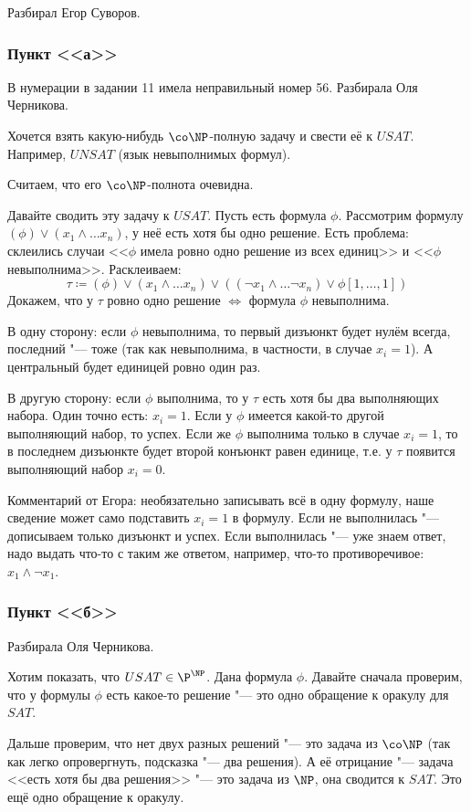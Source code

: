 	Разбирал Егор Суворов.

	\TODO

	\subsubsection{Пункт <<а>>}
	В нумерации в задании 11 имела неправильный номер 56.
	Разбирала Оля Черникова.

	Хочется взять какую-нибудь $\co\NP$-полную задачу и свести её к $USAT$.
	Например, $UNSAT$ (язык невыполнимых формул).
	\begin{Rem}
		Считаем, что его $\co\NP$-полнота очевидна.
		\TODO
	\end{Rem}
	Давайте сводить эту задачу к $USAT$.
	Пусть есть формула $\phi$.
	Рассмотрим формулу $(\phi) \lor (x_1 \land \dots x_n)$, у неё есть хотя бы одно решение.
	Есть проблема: склеились случаи <<$\phi$ имела ровно одно решение из всех единиц>> и <<$\phi$ невыполнима>>.
	Расклеиваем:
	\[
		\tau \coloneq (\phi) \lor (x_1 \land \dots x_n) \lor ((\lnot x_1 \land \dots \lnot x_n) \lor \phi[1, \dots, 1])
	\]
	Докажем, что у $\tau$ ровно одно решение $\iff$ формула $\phi$ невыполнима.

	В одну сторону: если $\phi$ невыполнима, то первый дизъюнкт будет нулём всегда, последний "--- тоже (так как невыполнима, в частности, в случае $x_i=1$).
	А центральный будет единицей ровно один раз.

	В другую сторону: если $\phi$ выполнима, то у $\tau$ есть хотя бы два выполняющих набора.
	Один точно есть: $x_i=1$.
	Если у $\phi$ имеется какой-то другой выполняющий набор, то успех.
	Если же $\phi$ выполнима только в случае $x_i=1$, то в последнем дизъюнкте будет второй конъюнкт равен единице,
	т.е. у $\tau$ появится выполняющий набор $x_i=0$.

	\begin{Rem}
		Комментарий от Егора: необязательно записывать всё в одну формулу, наше сведение может само подставить $x_i=1$ в формулу.
		Если не выполнилась "--- дописываем только дизъюнкт и успех.
		Если выполнилась "--- уже знаем ответ, надо выдать что-то с таким же ответом, например, что-то противоречивое: $x_1 \land \lnot x_1$.
	\end{Rem}

	\subsubsection{Пункт <<б>>}
	Разбирала Оля Черникова.

	Хотим показать, что $USAT \in \P^{\NP}$.
	Дана формула $\phi$.
	Давайте сначала проверим, что у формулы $\phi$ есть какое-то решение "--- это одно обращение к оракулу для $SAT$.

	Дальше проверим, что нет двух разных решений "--- это задача из $\co\NP$ (так как легко опровергнуть, подсказка "--- два решения).
	А её отрицание "--- задача <<есть хотя бы два решения>> "--- это задача из $\NP$, она сводится к $SAT$.
	Это ещё одно обращение к оракулу.

